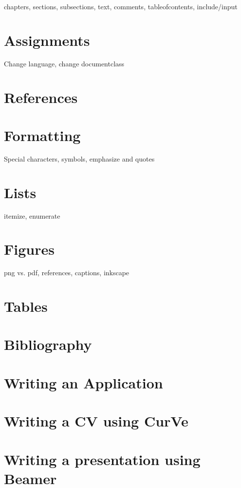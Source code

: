 chapters, sections, subsections, text, comments, tableofcontents, include/input

\section{Assignments}
Change language, change documentclass

\section{References}

\section{Formatting}
Special characters, symbols, emphasize and quotes

\section{Lists}
itemize, enumerate

\section{Figures}
png vs. pdf, references, captions, inkscape

\section{Tables}

\section{Bibliography}

\section{Writing an Application}

\section{Writing a CV using CurVe}

\section{Writing a presentation using Beamer}